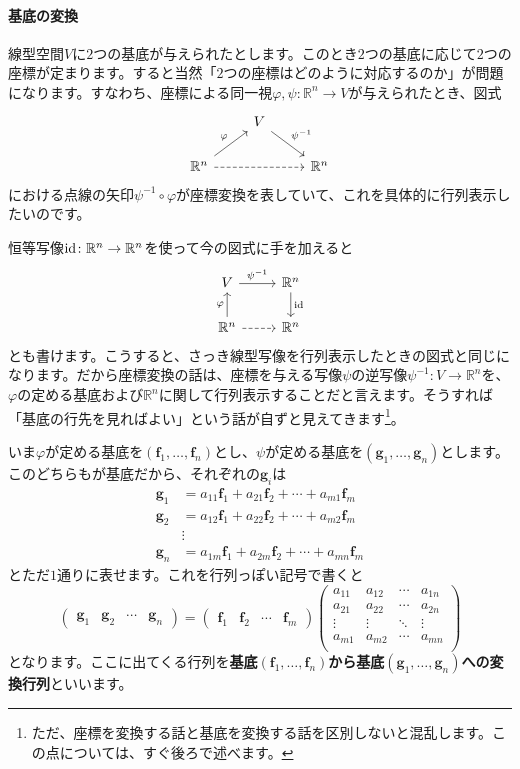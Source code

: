 \paragraph{基底の変換} 線型空間$V$に$2$つの基底が与えられたとします。このとき$2$つの基底に応じて$2$つの座標が定まります。すると当然「$2$つの座標はどのように対応するのか」が問題になります。すなわち、座標による同一視$\varphi, \psi\colon\mathbb{R}^n\rightarrow V$が与えられたとき、図式
\[
\begin{tikzcd}
& V \arrow{dr}{\psi^{-1}} & \\
\mathbb{R}^n \arrow[dashed]{rr} \arrow{ur}{\varphi} & & \mathbb{R}^n
\end{tikzcd}
\]
における点線の矢印$\psi^{-1}\circ\varphi$が座標変換を表していて、これを具体的に行列表示したいのです。

恒等写像$\operatorname{id}\colon\mathbb{R}^n\rightarrow\mathbb{R}^n$を使って今の図式に手を加えると
\[
\begin{tikzcd}
V \arrow{r}{\psi^{-1}} & \mathbb{R}^n \arrow{d}{\id} \\
\mathbb{R}^n \arrow{u}{\varphi} \arrow[dashed]{r} & \mathbb{R}^n
\end{tikzcd}
\]
とも書けます。こうすると、さっき線型写像を行列表示したときの図式と同じになります。だから座標変換の話は、座標を与える写像$\psi$の逆写像$\psi^{-1}\colon V\rightarrow \mathbb{R}^n$を、$\varphi$の定める基底および$\mathbb{R}^n$に関して行列表示することだと言えます。そうすれば「基底の行先を見ればよい」という話が自ずと見えてきます\footnote{ただ、座標を変換する話と基底を変換する話を区別しないと混乱します。この点については、すぐ後ろで述べます。}。

いま$\varphi$が定める基底を$(\bm{f}_1, \ldots, \bm{f}_n)$とし、$\psi$が定める基底を$(\bm{g}_1, \ldots, \bm{g}_n)$とします。このどちらもが基底だから、それぞれの$\bm{g}_i$は
\begin{align*}
\bm{g}_1 &= a_{11} \bm{f}_1 + a_{21} \bm{f}_2 + \cdots + a_{m1} \bm{f}_m \\
\bm{g}_2 &= a_{12} \bm{f}_1 + a_{22} \bm{f}_2 + \cdots + a_{m2} \bm{f}_m \\
&\vdots \\
\bm{g}_n &= a_{1m} \bm{f}_1 + a_{2m} \bm{f}_2 + \cdots + a_{mn} \bm{f}_m
\end{align*}
とただ$1$通りに表せます。これを行列っぽい記号で書くと
\[
\begin{pmatrix}
\bm{g}_1 & \bm{g}_2 & \cdots & \bm{g}_n
\end{pmatrix}
=
\begin{pmatrix}
\bm{f}_1 & \bm{f}_2 & \cdots & \bm{f}_m
\end{pmatrix}
\begin{pmatrix}
a_{11} & a_{12} & \cdots & a_{1n} \\
a_{21} & a_{22} & \cdots & a_{2n} \\
\vdots & \vdots & \ddots & \vdots \\
a_{m1} & a_{m2} & \cdots & a_{mn} \\
\end{pmatrix}
\]
となります。ここに出てくる行列を\textbf{基底$(\bm{f}_1, \ldots, \bm{f}_n)$から基底$(\bm{g}_1, \ldots, \bm{g}_n)$への変換行列}といいます。

